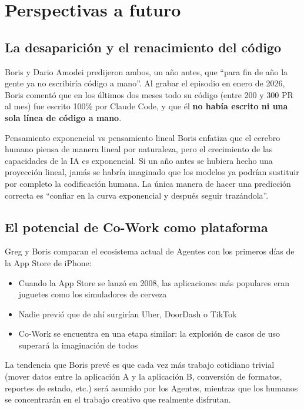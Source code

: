 \documentclass[a4paper]{article}
\begin{document}
\section{Perspectivas a futuro}

\subsection{La desaparición y el renacimiento del código}

Boris y Dario Amodei predijeron ambos, un año antes, que ``para fin de año la gente ya no escribiría código a mano''. Al grabar el episodio en enero de 2026, Boris comentó que en los últimos dos meses todo su código (entre 200 y 300 PR al mes) fue escrito 100\% por Claude Code, y que él \textbf{no había escrito ni una sola línea de código a mano}.

\begin{knowledgebox}{Pensamiento exponencial vs pensamiento lineal}
Boris enfatiza que el cerebro humano piensa de manera lineal por naturaleza, pero el crecimiento de las capacidades de la IA es exponencial. Si un año antes se hubiera hecho una proyección lineal, jamás se habría imaginado que los modelos ya podrían sustituir por completo la codificación humana. La única manera de hacer una predicción correcta es ``confiar en la curva exponencial y después seguir trazándola''.
\end{knowledgebox}

\subsection{El potencial de Co-Work como plataforma}

Greg y Boris comparan el ecosistema actual de Agentes con los primeros días de la App Store de iPhone:

\begin{itemize}
    \item Cuando la App Store se lanzó en 2008, las aplicaciones más populares eran juguetes como los simuladores de cerveza
    \item Nadie previó que de ahí surgirían Uber, DoorDash o TikTok
    \item Co-Work se encuentra en una etapa similar: la explosión de casos de uso superará la imaginación de todos
\end{itemize}

La tendencia que Boris prevé es que cada vez más trabajo cotidiano trivial (mover datos entre la aplicación A y la aplicación B, conversión de formatos, reportes de estado, etc.) será asumido por los Agentes, mientras que los humanos se concentrarán en el trabajo creativo que realmente disfrutan.
\end{document}
